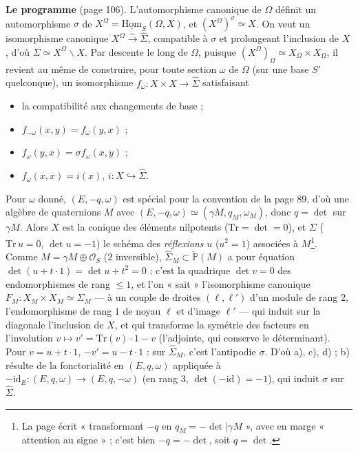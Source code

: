 \documentclass[11pt,a4paper]{article}
\begin{document}
\textbf{Le programme} (page 106). L'automorphisme canonique de $\Omega$ définit un
automorphisme $\sigma$ de $X^{\Omega} = \underline{\mathrm{Hom}}_S(\Omega, X)$, et
$(X^{\Omega})^{\sigma} \simeq X$. On veut un isomorphisme canonique $X^{\Omega}
\xrightarrow{\sim} \hat{\Sigma}$, compatible à $\sigma$ et prolongeant l'inclusion
de $X$, d'où $\Sigma \simeq X^{\Omega} \smallsetminus X$. Par descente le long de
$\Omega$, puisque $(X^{\Omega})_{\Omega} \simeq X_{\Omega} \times X_{\Omega}$, il
revient au même de construire, pour toute section $\omega$ de $\Omega$ (sur une base
$S'$ quelconque), un isomorphisme $f_\omega : X \times X \to \hat{\Sigma}$
satisfaisant
\begin{itemize}
  \item[a)] la compatibilité aux changements de base ;
  \item[b)] $f_{-\omega}(x, y) = f_\omega(y, x)$ ;
  \item[c)] $f_\omega(y, x) = \sigma f_\omega(x, y)$ ;
  \item[d)] $f_\omega(x, x) = i(x)$, $i : X \hookrightarrow \hat{\Sigma}$.
\end{itemize}
Pour $\omega$ donné, $(E, -q, \omega)$ est spécial pour la convention de la page 89,
d'où une algèbre de quaternions $M$ avec $(E, -q, \omega) \simeq (\gamma M, q_M,
\omega_M)$, donc $q = \det$ sur $\gamma M$. Alors $X$ est la conique des éléments
nilpotents ($\mathrm{Tr} = \det = 0$), et $\Sigma$ ($\mathrm{Tr}\,u = 0$, $\det u =
-1$) le schéma des \emph{réflexions} $u$ ($u^2 = 1$) associées à $M$\footnote{La page
écrit « transformant $-q$ en $q_M = -\det|\gamma M$ », avec en marge « attention au
signe » ; c'est bien $-q = -\det$, soit $q = \det$.}. Comme $M = \gamma M \oplus
\mathcal{O}_S$ ($2$ inversible), $\hat{\Sigma}_M \subset \check{\mathbb{P}}(M)$ a pour
équation $\det(u + t\cdot 1) = \det u + t^2 = 0$ : c'est la quadrique $\det v = 0$
des endomorphismes de rang $\leq 1$, et l'on « sait » l'isomorphisme canonique
$F_M : X_M \times X_M \simeq \hat{\Sigma}_M$ — à un couple de droites $(\ell, \ell')$
d'un module de rang $2$, l'endomorphisme de rang $1$ de noyau $\ell$ et d'image $\ell'$
— qui induit sur la diagonale l'inclusion de $X$, et qui transforme la symétrie
des facteurs en l'involution $v \mapsto v' = \mathrm{Tr}(v)\cdot 1 - v$ (l'adjointe,
qui conserve le déterminant). Pour $v = u + t\cdot 1$, $-v' = u - t\cdot 1$ : sur
$\hat{\Sigma}_M$, c'est l'antipodie $\sigma$. D'où a), c), d) ; b) résulte de la
fonctorialité en $(E, q, \omega)$ appliquée à $-\mathrm{id}_E : (E, q, \omega) \to
(E, q, -\omega)$ (en rang $3$, $\det(-\mathrm{id}) = -1$), qui induit $\sigma$ sur
$\hat{\Sigma}$.
\end{document}
